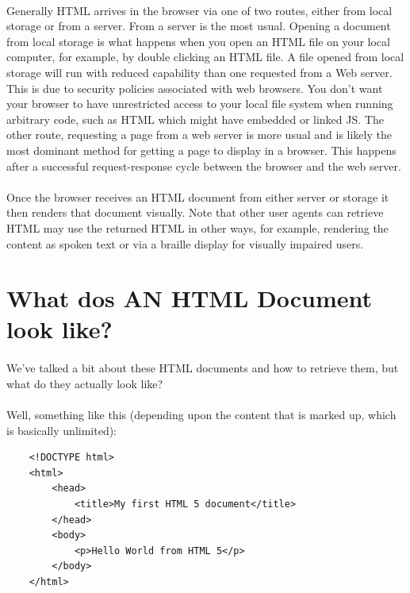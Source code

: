 \paragraph{} Generally HTML arrives in the browser via one of two routes, either from local storage or from a server. From a server is the most usual. Opening a document from local storage is what happens when you open an HTML file on your local computer, for example, by double clicking an HTML file. A file opened from local storage will run with reduced capability than one requested from a Web server. This is due to security policies associated with web browsers. You don't want your browser to have unrestricted access to your local file system when running arbitrary code, such as HTML which might have embedded or linked JS. The other route, requesting a page from a web server is more usual and is likely the most dominant method for getting a page to display in a browser. This happens after a successful request-response cycle between the browser and the web server. 
\paragraph{} Once the browser receives an HTML document from either server or storage it then renders that document visually. Note that other user agents can retrieve HTML may use the returned HTML in other ways, for example, rendering the content as spoken text or via a braille display for visually impaired users.

\section{What dos AN HTML Document look like?}
\paragraph{} We've talked a bit about these HTML documents and how to retrieve them, but what do they actually look like?
\paragraph{} Well, something like this (depending upon the content that is marked up, which is basically unlimited):
\begin{lstlisting}
	<!DOCTYPE html>
	<html>
		<head>
			<title>My first HTML 5 document</title>
		</head>
		<body>
			<p>Hello World from HTML 5</p>
		</body>
	</html>
\end{lstlisting}

